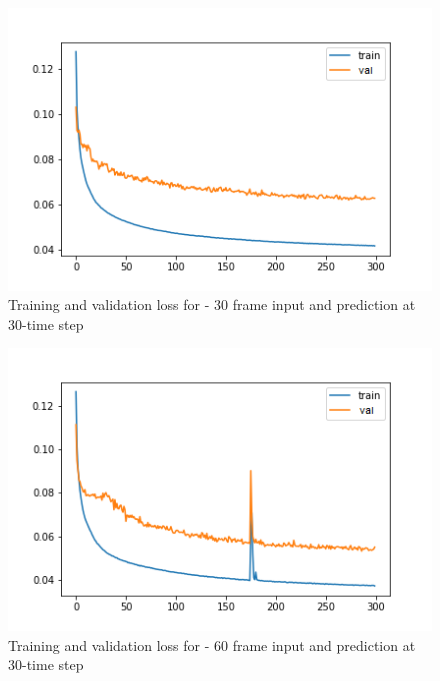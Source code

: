 \begin{figure}[H] 
\includegraphics[scale=0.8]{conf10_300e_30ffuture}
\begin{center}
\caption{Training and validation loss for - 30 frame input and prediction at 30-time step }
\label{30-30}
\end{center}
\end{figure}

\begin{figure}[H] 
\includegraphics[scale=0.8]{conf11_300e_60_30ffuture}
\begin{center}
\caption{Training and validation loss for - 60 frame input and prediction at 30-time step }
\label{60-30}
\end{center}
\end{figure}

